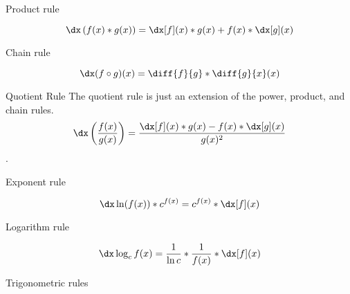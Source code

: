 \begin{psec}{Product rule}\label{rule:derivative product}

    \begin{equation}\label{eq:derivative prod}
        \dx \left(f(x)*g(x)\right) = \dx[f](x) *  g(x) + f(x) *
        \dx[g](x)
    \end{equation}

\end{psec}

\begin{psec}{Chain rule}\label{rule:derivative chain}

    \begin{equation}\label{eq:derivative chain}
        \dx (f \circ g)(x) = \diff{f}{g} * \diff{g}{x}(x)
    \end{equation}

\end{psec}

\begin{psec}{Quotient Rule}\label{rule:derivative quotient} The quotient rule is just an extension of the
    power, product, and chain rules.
    \begin{equation}
        \dx \left(\frac{f(x)}{g(x)}\right) = \frac{\dx[f](x) * g(x) - f(x) * \dx[g](x)
        }{g(x)^2}
    \end{equation}.

\end{psec}

\begin{psec}{Exponent rule}\label{rule:derivative exponent}

    \begin{equation}
        \dx \ln(f(x)) * c ^ {f(x)} = c ^ {f(x)} * \dx[f](x)
    \end{equation}

\end{psec}

\begin{psec}{Logarithm rule}\label{rule:derivative log}

    \begin{equation}
        \dx \log_c f(x) = \frac{1}{\ln c} * \frac{1}{f(x)} * \dx[f] (x)
    \end{equation}

\end{psec}


\begin{psec}{Trigonometric rules}


\end{psec}
